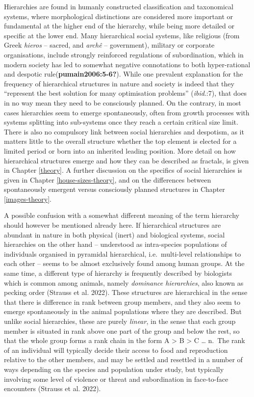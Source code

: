 \documentclass[
  12pt,
]{book}
\begin{document}
Hierarchies are found in humanly constructed classification and taxonomical systems, where morphological distinctions are considered more important or fundamental at the higher end of the hierarchy, while being more detailed or specific at the lower end. Many hierarchical social systems, like religious (from Greek \emph{hieros} -- sacred, and \emph{archê} -- government), military or corporate organisations, include strongly reinforced regulations of subordination, which in modern society has led to somewhat negative connotations to both hyper-rational and despotic rule(\textbf{pumain2006:5-6?}). While one prevalent explanation for the frequency of hierarchical structures in nature and society is indeed that they ``represent the best solution for many optimisation problems'' (\emph{ibid}.:7), that does in no way mean they need to be consciously planned. On the contrary, in most cases hierarchies seem to emerge spontaneously, often from growth processes with systems splitting into sub-systems once they reach a certain critical size limit. There is also no compulsory link between social hierarchies and despotism, as it matters little to the overall structure whether the top element is elected for a limited period or born into an inherited leading position. More detail on how hierarchical structures emerge and how they can be described as fractals, is given in Chapter \ref{theory}. A further discussion on the specifics of social hierarchies is given in Chapter \ref{house-sizes-theory}, and on the differences between spontaneously emergent versus consciously planned structures in Chapter \ref{images-theory}.

A possible confusion with a somewhat different meaning of the term hierarchy should however be mentioned already here. If hierarchical structures are abundant in nature in both physical (inert) and biological systems, social hierarchies on the other hand -- understood as intra-species populations of individuals organised in pyramidal hierarchical, i.e.~multi-level relationships to each other -- seems to be almost exclusively found among human groups. At the same time, a different type of hierarchy is frequently described by biologists which is common among animals, namely \emph{dominance hierarchies}, also known as pecking order (Strauss et al. 2022). These structures are hierarchical in the sense that there is difference in rank between group members, and they also seem to emerge spontaneously in the animal populations where they are described. But unlike social hierarchies, these are purely \emph{linear}, in the sense that each group member is situated in rank above one part of the group and below the rest, so that the whole group forms a rank chain in the form A \textgreater{} B \textgreater{} C \ldots{} n.~The rank of an individual will typically decide their access to food and reproduction relative to the other members, and may be settled and resettled in a number of ways depending on the species and population under study, but typically involving some level of violence or threat and subordination in face-to-face encounters (Strauss et al. 2022).
\end{document}
